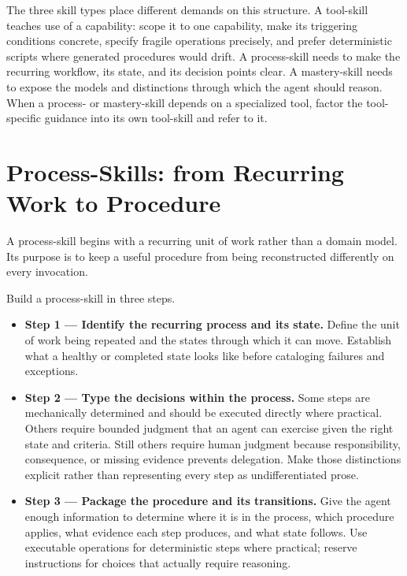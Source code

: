 
The three skill types place different demands on this structure. A tool-skill teaches use of a capability: scope it to one capability, make its triggering conditions concrete, specify fragile operations precisely, and prefer deterministic scripts where generated procedures would drift. A process-skill needs to make the recurring workflow, its state, and its decision points clear. A mastery-skill needs to expose the models and distinctions through which the agent should reason. When a process- or mastery-skill depends on a specialized tool, factor the tool-specific guidance into its own tool-skill and refer to it.

\section{Process-Skills: from Recurring Work to Procedure}\label{heading:process-skills-from-recurring-work-to-procedure}


A process-skill begins with a recurring unit of work rather than a domain model. Its purpose is to keep a useful procedure from being reconstructed differently on every invocation.


Build a process-skill in three steps.

\begin{itemize}
\tightlist
\item
  \textbf{Step 1 --- Identify the recurring process and its state.} Define the unit of work being repeated and the states through which it can move. Establish what a healthy or completed state looks like before cataloging failures and exceptions.
\item
  \textbf{Step 2 --- Type the decisions within the process.} Some steps are mechanically determined and should be executed directly where practical. Others require bounded judgment that an agent can exercise given the right state and criteria. Still others require human judgment because responsibility, consequence, or missing evidence prevents delegation. Make those distinctions explicit rather than representing every step as undifferentiated prose.
\item
  \textbf{Step 3 --- Package the procedure and its transitions.} Give the agent enough information to determine where it is in the process, which procedure applies, what evidence each step produces, and what state follows. Use executable operations for deterministic steps where practical; reserve instructions for choices that actually require reasoning.
\end{itemize}


